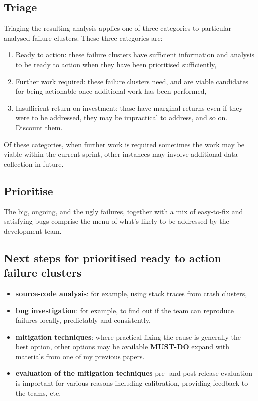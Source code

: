 \subsection{Triage}
Triaging the resulting analysis applies one of three categories to particular analysed failure clusters. These three categories are:
\begin{enumerate}
    \item Ready to action: these failure clusters have sufficient information and analysis to be ready to action when they have been prioritised sufficiently,
    \item Further work required: these failure clusters need, and are viable candidates for being actionable once additional work has been performed,
    \item Insufficient return-on-investment: these have marginal returns even if they were to be addressed, they may be impractical to address, and so on. Discount them.
\end{enumerate}

Of these categories, when further work is required sometimes the work may be viable within the current sprint, other instances may involve additional data collection in future.

\subsection{Prioritise}
The big, ongoing, and the ugly failures, together with a mix of easy-to-fix and satisfying bugs comprise the menu of what's likely to be addressed by the development team. 

\subsection{Next steps for prioritised ready to action failure clusters}

\begin{itemize}
    \item \textbf{source-code analysis}: for example, using stack traces from crash clusters,
    \item \textbf{bug investigation}: for example, to find out if the team can reproduce failures locally, predictably and consistently,
    \item \textbf{mitigation techniques}: where practical fixing the cause is generally the best option, other options may be available \textbf{MUST-DO} expand with materials from one of my previous papers.
    \item \textbf{evaluation of the mitigation techniques} pre- and post-release evaluation is important for various reasons including calibration, providing feedback to the teams, etc.
\end{itemize}


